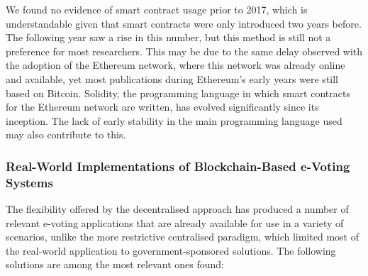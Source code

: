 \documentclass[../access.tex]{subfiles}
\begin{document}
	\par
    We found no evidence of smart contract usage prior to 2017, which is understandable given that smart contracts were only introduced two years before. The following year saw a rise in this number, but this method is still not a preference for most researchers. This may be due to the same delay observed with the adoption of the Ethereum network, where this network was already online and available, yet most publications during Ethereum's early years were still based on Bitcoin. Solidity, the programming language in which smart contracts for the Ethereum network are written, has evolved significantly since its inception. The lack of early stability in the main programming language used may also contribute to this.

\subsubsection{Real-World Implementations of Blockchain-Based e-Voting Systems}
\label{real-world-decentralized-solutions}
    The flexibility offered by the decentralised approach has produced a number of relevant e-voting applications that are already available for use in a variety of scenarios, unlike the more restrictive centralised paradigm, which limited most of the real-world application to government-sponsored solutions. The following solutions are among the most relevant ones found:
\end{document}

